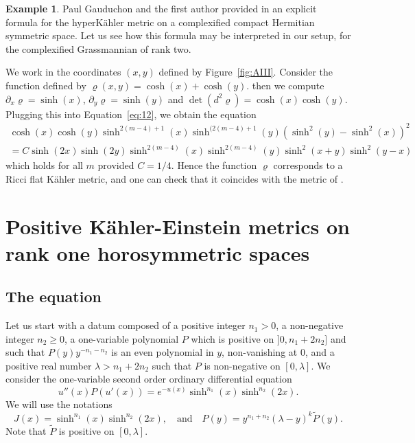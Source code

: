 \documentclass[10pt]{amsart}
\theoremstyle{plain}
\theoremstyle{definition}
\newtheorem{exa}[thm]{Example}
\begin{document}
\begin{exa}
Paul Gauduchon and the first author provided in \cite{BG96} an explicit formula
for the hyperKähler metric on a complexified compact Hermitian symmetric space.
Let us see how this formula may be interpreted in our setup, for the
complexified Grassmannian of rank two.

We work in the coordinates $(x,y)$ defined by Figure~\ref{fig:AIII}.
Consider the function defined by $\varrho(x,y)=\cosh(x)+\cosh(y)$.
then we compute $\partial_x\varrho=\sinh(x)$, $\partial_y\varrho=\sinh(y)$ and
$\det(d^2\varrho)=\cosh(x)\cosh(y)$.
Plugging this into Equation~\ref{eq:12}, we obtain the equation
\begin{multline*}
\cosh(x)\cosh(y)\sinh^{2(m-4)+1}(x)\sinh^{(2(m-4)+1}(y)(\sinh^2(y)-\sinh^2(x))^2\\
=C\sinh(2x)\sinh(2y)\sinh^{2(m-4)}(x)\sinh^{2(m-4)}(y)\sinh^2(x+y)\sinh^2(y-x)
\end{multline*}
which holds for all $m$ provided $C=1/4$. Hence the function $\varrho$
corresponds to a Ricci flat Kähler metric, and one can check that it coincides
with the metric of \cite{BG96}.
\end{exa}

\section{Positive Kähler-Einstein metrics on rank one horosymmetric spaces}
\label{sec:KE}

\subsection{The equation}

Let us start with a datum composed of
a positive integer $n_1>0$, a non-negative integer $n_2\geq 0$,
a one-variable polynomial $P$ which is positive on $]0,n_1+2n_2]$ and such that
	$P(y)y^{-n_1-n_2}$ is an even polynomial in $y$, non-vanishing at $0$,
and a positive real number $\lambda>n_1+2n_2$ such that $P$ is non-negative on $[0,\lambda]$.
We consider the one-variable second order ordinary differential equation
\begin{equation}
\label{eqn_genKE}
u''(x)P(u'(x))=e^{-u(x)}\sinh^{n_1}(x)\sinh^{n_2}(2x).
\end{equation}
We will use the notations
$$J(x)=\sinh^{n_1}(x)\sinh^{n_2}(2x), \quad\text{and}\quad
P(y)=y^{n_1+n_2}(\lambda-y)^{k}\tilde{P}(y).$$ Note that
$\tilde{P}$ is positive on $[0,\lambda]$.
\end{document}
